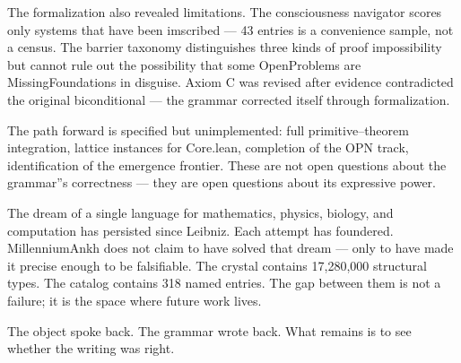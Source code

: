 \documentclass[12pt,a4paper]{article}
\begin{document}
The formalization also revealed limitations. The consciousness navigator scores only systems that have been imscribed --- 43 entries is a convenience sample, not a census. The barrier taxonomy distinguishes three kinds of proof impossibility but cannot rule out the possibility that some OpenProblems are MissingFoundations in disguise. Axiom C was revised after evidence contradicted the original biconditional --- the grammar corrected itself through formalization.

The path forward is specified but unimplemented: full primitive--theorem integration, lattice instances for Core.lean, completion of the OPN track, identification of the emergence frontier. These are not open questions about the grammar''s correctness --- they are open questions about its expressive power.

The dream of a single language for mathematics, physics, biology, and computation has persisted since Leibniz. Each attempt has foundered. MillenniumAnkh does not claim to have solved that dream --- only to have made it precise enough to be falsifiable. The crystal contains 17,280,000 structural types. The catalog contains 318 named entries. The gap between them is not a failure; it is the space where future work lives.

The object spoke back. The grammar wrote back. What remains is to see whether the writing was right.
\end{document}
